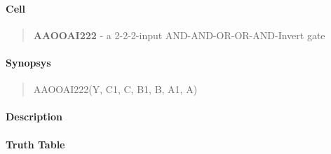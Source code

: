\label{AAOOAI222}
\paragraph{Cell}
\begin{quote}
    \textbf{AAOOAI222} - a 2-2-2-input AND-AND-OR-OR-AND-Invert gate
\end{quote}

\paragraph{Synopsys}
\begin{quote}
    AAOOAI222(Y, C1, C, B1, B, A1, A)
\end{quote}

\paragraph{Description}

%

\paragraph{Truth Table}
%

